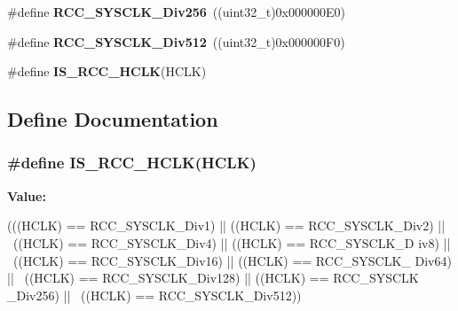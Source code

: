 \begin{DoxyCompactItemize}
\item 
\hypertarget{group__AHB__clock__source_gaa28bb876893b3267a813fc98a462d5ee}{
\#define {\bfseries RCC\_\-SYSCLK\_\-Div256}~((uint32\_\-t)0x000000E0)}
\label{group__AHB__clock__source_gaa28bb876893b3267a813fc98a462d5ee}

\item 
\hypertarget{group__AHB__clock__source_gab5b4588c455d6327bc96f131ed6698ab}{
\#define {\bfseries RCC\_\-SYSCLK\_\-Div512}~((uint32\_\-t)0x000000F0)}
\label{group__AHB__clock__source_gab5b4588c455d6327bc96f131ed6698ab}

\item 
\#define {\bfseries IS\_\-RCC\_\-HCLK}(HCLK)
\end{DoxyCompactItemize}


\subsection{Define Documentation}
\hypertarget{group__AHB__clock__source_ga6e9f1c193a2f41bcb3c2f7fa8459b5b3}{
\subsubsection[{IS\_\-RCC\_\-HCLK}]{\setlength{\rightskip}{0pt plus 5cm}\#define IS\_\-RCC\_\-HCLK(HCLK)}}
\label{group__AHB__clock__source_ga6e9f1c193a2f41bcb3c2f7fa8459b5b3}
{\bfseries Value:}
\begin{DoxyCode}
(((HCLK) == RCC_SYSCLK_Div1) || ((HCLK) == RCC_SYSCLK_Div2) || \
                           ((HCLK) == RCC_SYSCLK_Div4) || ((HCLK) == RCC_SYSCLK_D
      iv8) || \
                           ((HCLK) == RCC_SYSCLK_Div16) || ((HCLK) == RCC_SYSCLK_
      Div64) || \
                           ((HCLK) == RCC_SYSCLK_Div128) || ((HCLK) == RCC_SYSCLK
      _Div256) || \
                           ((HCLK) == RCC_SYSCLK_Div512))
\end{DoxyCode}
